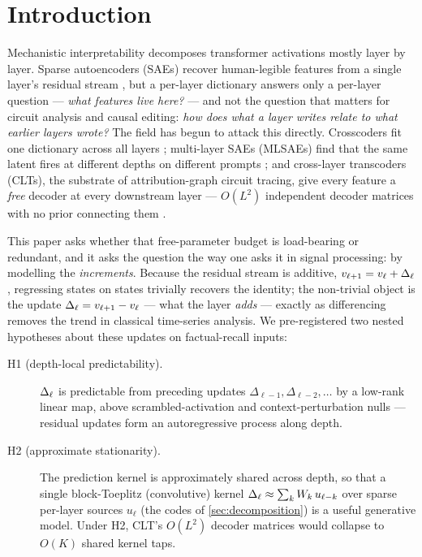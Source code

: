 \section{Introduction}
\label{sec:intro}

Mechanistic interpretability decomposes transformer activations mostly layer by
layer. Sparse autoencoders (SAEs) recover human-legible features from a single
layer's residual stream \citep{cunningham2024sparse,bricken2023monosemanticity,
templeton2024scaling}, but a per-layer dictionary answers only a per-layer
question --- \emph{what features live here?} --- and not the question that
matters for circuit analysis and causal editing: \emph{how does what a layer
writes relate to what earlier layers wrote?} The field has begun to attack
this directly. Crosscoders fit one dictionary across all layers
\citep{lindsey2024crosscoders}; multi-layer SAEs (MLSAEs) find that the same
latent fires at different depths on different prompts \citep{lawson2025mlsae};
and cross-layer transcoders (CLTs), the substrate of attribution-graph circuit
tracing, give every feature a \emph{free} decoder at every downstream layer ---
$O(L^2)$ independent decoder matrices with no prior connecting them
\citep{ameisen2025circuit}.

This paper asks whether that free-parameter budget is load-bearing or
redundant, and it asks the question the way one asks it in signal processing:
by modelling the \emph{increments}. Because the residual stream is additive,
$v_{\ell+1} = v_\ell + \Delta_\ell$, regressing states on states trivially recovers the
identity; the non-trivial object is the update $\Delta_\ell = v_{\ell+1} - v_\ell$ ---
what the layer \emph{adds} --- exactly as differencing removes the trend in
classical time-series analysis. We pre-registered two nested hypotheses about
these updates on factual-recall inputs:

\begin{description}
  \item[H1 (depth-local predictability).] $\Delta_\ell$ is predictable from preceding
    updates $\Delta_{\ell-1}, \Delta_{\ell-2}, \dots$ by a low-rank linear
    map, above scrambled-activation and context-perturbation nulls ---
    residual updates form an autoregressive process along depth.
  \item[H2 (approximate stationarity).] The prediction kernel is approximately
    shared across depth, so that a single block-Toeplitz (convolutive) kernel
    $\Delta_\ell \approx \sum_k W_k\, u_{\ell-k}$ over sparse per-layer sources
    $u_\ell$ (the codes of \cref{sec:decomposition}) is a
    useful generative model. Under H2, CLT's $O(L^2)$ decoder matrices would
    collapse to $O(K)$ shared kernel taps.
\end{description}

